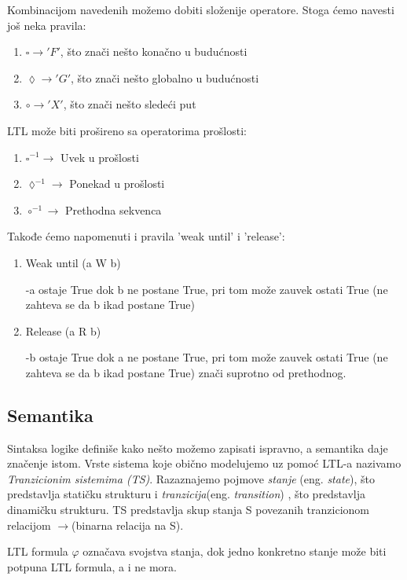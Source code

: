 \documentclass[a4paper]{article}
\begin{document}
{	Kombinacijom navedenih možemo dobiti složenije operatore. Stoga ćemo navesti još neka pravila:
\begin{enumerate}	
\item $\square \rightarrow 'F'$, što znači nešto konačno u budućnosti 
\item $\lozenge \rightarrow 'G'$, što znači nešto globalno u budućnosti 
\item $\circ \rightarrow 'X'$, što znači nešto sledeći put 
\end{enumerate}

	LTL može biti prošireno sa operatorima prošlosti: 
\begin{enumerate}	
\item $\square^{-1} \rightarrow $ Uvek u prošlosti 
\item $\lozenge^{-1} \rightarrow $  Ponekad u prošlosti 
\item $\circ^{-1} \rightarrow $ Prethodna sekvenca 
\end{enumerate}

   Takođe ćemo napomenuti i pravila 'weak until' i 'release':
\begin{enumerate}	
\item  Weak until (a W b)

		-a ostaje True dok b ne postane True, pri tom može zauvek ostati True (ne zahteva se da b ikad postane True)
\item   Release (a R b) 

		-b ostaje True dok a ne postane True, pri tom može zauvek ostati True (ne zahteva se da b ikad postane True) znači suprotno od prethodnog.
\end{enumerate}		

	\subsection{Semantika}
	\label{subsec:podnaslovN}
	
	Sintaksa logike definiše kako nešto možemo zapisati ispravno, a semantika daje značenje istom.
	Vrste sistema koje obično modelujemo uz pomoć LTL-a nazivamo \emph{Tranzicionim sistemima (TS)}. Razaznajemo pojmove \emph{stanje} (eng. \emph{state}), što predstavlja statičku strukturu i \emph{tranzicija}(eng. \emph{transition}) , što predstavlja dinamičku strukturu. TS predstavlja skup stanja S povezanih tranzicionom relacijom $\rightarrow $(binarna relacija na S).\cite{reeves1990logic}
	
	LTL formula $\varphi$ označava svojstva stanja, dok jedno konkretno stanje može biti potpuna LTL formula, a i ne mora.
	
}
\end{document}
